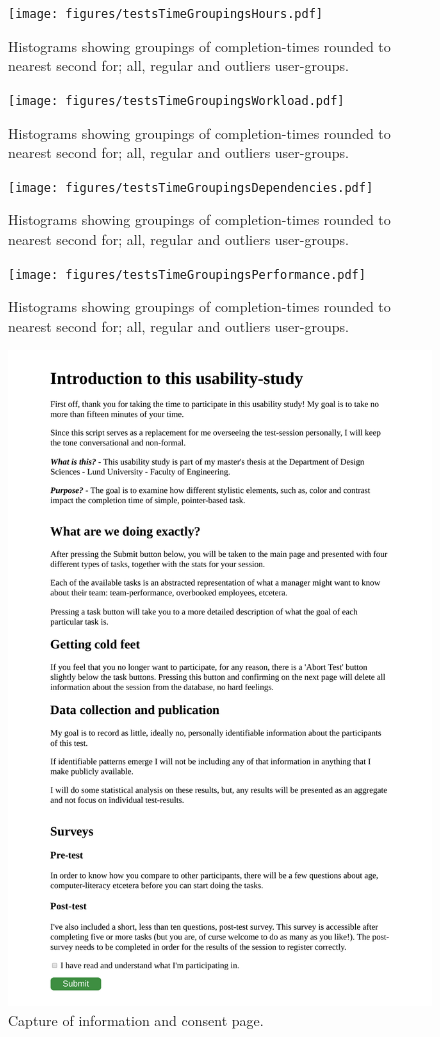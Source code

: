 \begin{figure}[h!]
  \centering
  \texttt{[image: figures/testsTimeGroupingsHours.pdf]}
  \caption{
    Histograms showing groupings of completion-times rounded to nearest
    second for; all, regular and outliers user-groups.
  }
\end{figure}

\begin{figure}[h!]
  \centering
  \texttt{[image: figures/testsTimeGroupingsWorkload.pdf]}
  \caption{
    Histograms showing groupings of completion-times rounded to nearest
    second for; all, regular and outliers user-groups.
  }
\end{figure}

\begin{figure}[h!]
  \centering
  \texttt{[image: figures/testsTimeGroupingsDependencies.pdf]}
  \caption{
    Histograms showing groupings of completion-times rounded to nearest
    second for; all, regular and outliers user-groups.
  }
\end{figure}

\begin{figure}[h!]
  \centering
  \texttt{[image: figures/testsTimeGroupingsPerformance.pdf]}
  \caption{
    Histograms showing groupings of completion-times rounded to nearest
    second for; all, regular and outliers user-groups.
  }
\end{figure}

\begin{figure}[h!]
  \centering
  \includegraphics[width=\textwidth]{figures/captures/webapp_information_consent.pdf}
  \caption{Capture of information and consent page.}
  \label{label_infoConsent}
\end{figure}
